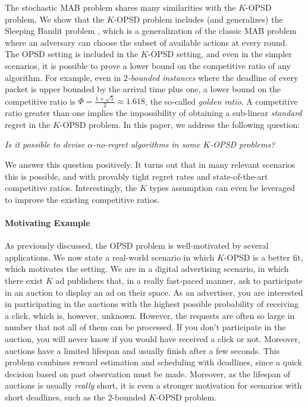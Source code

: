 The stochastic MAB problem \cite{lattimore2020bandit} shares many similarities with the $K$-OPSD problem. 
We show that the $K$-OPSD problem includes (and generalizes) the Sleeping Bandit problem \cite{kleinberg2010regret}, which is a generalization of the classic MAB problem where an adversary can choose the subset of available actions at every round.
The OPSD setting is included in the $K$-OPSD setting, and even in the simpler scenarios, it is possible to prove a lower bound on the competitive ratio of any algorithm. For example, even in $2$\textit{-bounded instances} where the deadline of every packet is upper bounded by the arrival time plus one, a lower bound on the competitive ratio is $\Phi = \frac{1+\sqrt{5}}{2} \approx 1.618$, the so-called \textit{golden ratio}. A competitive ratio greater than one implies the impossibility of obtaining a sub-linear \emph{standard} regret in the $K$-OPSD problem. In this paper, we address the following question:
\begin{center}
    \textit{Is it possible to devise $\alpha$-no-regret algorithms in some $K$-OPSD problems?} 
\end{center}
We answer this question positively. It turns out that in many relevant scenarios this is possible, and with provably tight regret rates and state-of-the-art competitive ratios. Interestingly, the $K$ types assumption can even be leveraged to improve the existing competitive ratios.
\paragraph{Motivating Example}
As previously discussed, the OPSD problem is well-motivated by several applications. We now state a real-world scenario in which $K$-OPSD is a better fit, which motivates the setting. We are in a digital advertising scenario, in which there exist $K$ ad publishers that, in a really fast-paced manner, ask to participate in an auction to display an ad on their space. As an advertiser, you are interested in participating in the auctions with the highest possible probability of receiving a click, which is, however, unknown. However, the requests are often so large in number that not all of them can be processed. If you don't participate in the auction, you will never know if you would have received a click or not. Moreover, auctions have a limited lifespan and usually finish after a few seconds. This problem combines reward estimation and scheduling with deadlines, since a quick decision based on past observation must be made. Moreover, as the lifespan of auctions is usually \textit{really} short, it is even a stronger motivation for scenarios with short deadlines, such as the $2$-bounded $K$-OPSD problem.

